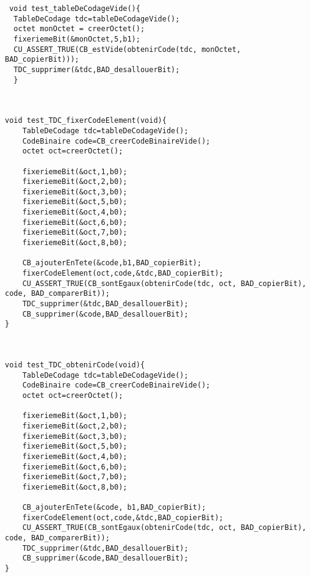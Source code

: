 \begin{verbatim}
 void test_tableDeCodageVide(){
  TableDeCodage tdc=tableDeCodageVide();
  octet monOctet = creerOctet();
  fixeriemeBit(&monOctet,5,b1);
  CU_ASSERT_TRUE(CB_estVide(obtenirCode(tdc, monOctet, BAD_copierBit)));
  TDC_supprimer(&tdc,BAD_desallouerBit);
  }



void test_TDC_fixerCodeElement(void){
    TableDeCodage tdc=tableDeCodageVide();
    CodeBinaire code=CB_creerCodeBinaireVide();
    octet oct=creerOctet();

    fixeriemeBit(&oct,1,b0);
    fixeriemeBit(&oct,2,b0);
    fixeriemeBit(&oct,3,b0);
    fixeriemeBit(&oct,5,b0);
    fixeriemeBit(&oct,4,b0);
    fixeriemeBit(&oct,6,b0);
    fixeriemeBit(&oct,7,b0);
    fixeriemeBit(&oct,8,b0);

    CB_ajouterEnTete(&code,b1,BAD_copierBit);
    fixerCodeElement(oct,code,&tdc,BAD_copierBit);
    CU_ASSERT_TRUE(CB_sontEgaux(obtenirCode(tdc, oct, BAD_copierBit), code, BAD_comparerBit));
    TDC_supprimer(&tdc,BAD_desallouerBit);
    CB_supprimer(&code,BAD_desallouerBit);
}



void test_TDC_obtenirCode(void){
    TableDeCodage tdc=tableDeCodageVide();
    CodeBinaire code=CB_creerCodeBinaireVide();
    octet oct=creerOctet();

    fixeriemeBit(&oct,1,b0);
    fixeriemeBit(&oct,2,b0);
    fixeriemeBit(&oct,3,b0);
    fixeriemeBit(&oct,5,b0);
    fixeriemeBit(&oct,4,b0);
    fixeriemeBit(&oct,6,b0);
    fixeriemeBit(&oct,7,b0);
    fixeriemeBit(&oct,8,b0);

    CB_ajouterEnTete(&code, b1,BAD_copierBit);
    fixerCodeElement(oct,code,&tdc,BAD_copierBit);
    CU_ASSERT_TRUE(CB_sontEgaux(obtenirCode(tdc, oct, BAD_copierBit), code, BAD_comparerBit));
    TDC_supprimer(&tdc,BAD_desallouerBit);
    CB_supprimer(&code,BAD_desallouerBit);
}

\end{verbatim}
 
